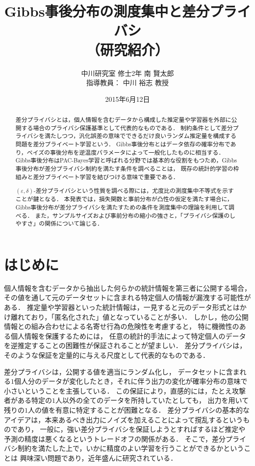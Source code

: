 \documentclass{jarticle}
\title{Gibbs事後分布の測度集中と差分プライバシ\\（研究紹介）}
\author{中川研究室 修士2年 南 賢太郎\\指導教員： 中川 裕志 教授}
\date{2015年6月12日}
\theoremstyle{definition}
\begin{document}
\maketitle
\begin{abstract}
差分プライバシとは，個人情報を含むデータから構成した推定量や学習器を外部に公開する場合のプライバシ保護基準として代表的なものである．
制約条件として差分プライバシを満たしつつ，汎化誤差の意味でできるだけ良いランダム推定量を構成する問題を差分プライベート学習という．
Gibbs事後分布とはデータ依存の確率分布であり，ベイズの事後分布を逆温度パラメータによって一般化したものに相当する．
Gibbs事後分布はPAC-Bayes学習と呼ばれる分野では基本的な役割をもつため，Gibbs事後分布が差分プライバシ制約を満たす条件を調べることは，
既存の統計的学習の枠組みと差分プライベート学習を結びつける意味で重要である．

$(\varepsilon, \delta)$-差分プライバシという性質を調べる際には，尤度比の測度集中不等式を示すことが鍵となる．
本発表では，損失関数と事前分布が凸性の仮定を満たす場合に，Gibbs事後分布が差分プライバシを満たすための条件を測度集中の理論を利用して調べる．
また，サンプルサイズおよび事前分布の縮小の強さと，「プライバシ保護のしやすさ」の関係について論じる．
\end{abstract}

\section{はじめに}

個人情報を含むデータから抽出した何らかの統計情報を第三者に公開する場合，
その値を通して元のデータセットに含まれる特定個人の情報が漏洩する可能性がある．
推定量や学習器といった統計情報は，一見すると元のデータ形式とはかけ離れており，「匿名化された」値となっていることが多い．
しかし，他の公開情報との組み合わせによる名寄せ行為の危険性を考慮すると，
特に機微性のある個人情報を保護するためには，
任意の統計的手法によって特定個人のデータを逆推定することの困難性が保証されることが望ましい．
差分プライバシ\cite{Dwork2006b}は，そのような保証を定量的に与える尺度として代表的なものである．

差分プライバシは，公開する値を適当にランダム化し，
データセットに含まれる$1$個人分のデータが変化したとき，それに伴う出力の変化が確率分布の意味で小さいということを主張している．
この保証により，直感的には，たとえ攻撃者がある特定の$1$人以外の全てのデータを所持していたとしても，
出力を用いて残りの$1$人の値を有意に特定することが困難となる．
差分プライバシの基本的なアイデアは，本来あるべき出力にノイズを加えることによって撹乱するというものであり，
一般に，強い差分プライバシを保証しようとすればするほど推定や予測の精度は悪くなるというトレードオフの関係がある．
そこで，差分プライバシ制約を満たした上で，いかに精度のよい学習を行うことができるかということは
興味深い問題であり，近年盛んに研究されている\cite{Chaudhuri2011,Kifer2012,Bassily2014,Talwar2014}．
\end{document}
